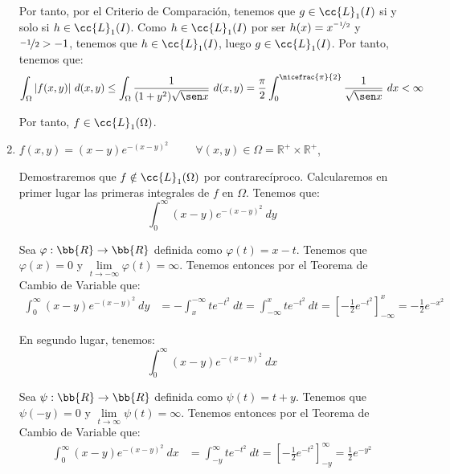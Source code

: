\begin{ejercicio}
\begin{enumerate}
        Por tanto, por el Criterio de Comparación, tenemos que $g\in \cc{L}_1(I)$ si y solo si $h\in \cc{L}_1(I)$. Como $h\in \cc{L}_1(I)$ por ser $h(x)=x^{\nicefrac{-1}{2}}$ y $\nicefrac{-1}{2}>-1$,
        tenemos que $h\in \cc{L}_1(I)$, luego $g\in \cc{L}_1(I)$. Por tanto, tenemos que:
        \begin{equation*}
            \int_{\Omega} |f(x, y)|~d(x, y) \leq
            \int_{\Omega} \dfrac{1}{(1 + y^2) \sqrt{\sen x}}~d(x, y)
            = \frac{\pi}{2}\int_{0}^{\nicefrac{\pi}{2}} \frac{1}{\sqrt{\sen x}}~dx < \infty
        \end{equation*}

        Por tanto, $f\in \cc{L}_1(\Omega)$.

        \item $f(x, y) = (x - y) e^{-(x-y)^2} \hspace{1cm} \forall (x, y) \in \Omega= \mathbb{R}^+ \times \mathbb{R}^+$,
        
        Demostraremos que $f\notin \cc{L}_1(\Omega)$ por contrarecíproco. Calcularemos en primer lugar las primeras integrales de $f$ en $\Omega$.
        Tenemos que:
        \begin{equation*}
            \int_{0}^{\infty} (x-y)e^{-(x-y)^2}~dy
        \end{equation*}

        Sea $\varphi:\bb{R}\to\bb{R}$ definida como $\varphi(t)=x-t$. Tenemos que $\varphi(x)=0$ y $\lim\limits_{t\to-\infty}\varphi(t)=\infty$. Tenemos entonces por el
        Teorema de Cambio de Variable que:
        \begin{align*}
            \int_{0}^{\infty} (x-y)e^{-(x-y)^2}~dy
            &= -\int_{x}^{-\infty}te^{-t^2}~dt
            = \int_{-\infty}^{x} te^{-t^2}~dt
            = \left[ -\frac{1}{2}e^{-t^2} \right]_{-\infty}^{x} = -\frac{1}{2}e^{-x^2}
        \end{align*}

        En segundo lugar, tenemos:
        \begin{equation*}
            \int_{0}^{\infty} (x-y)e^{-(x-y)^2}~dx
        \end{equation*}

        Sea $\psi:\bb{R}\to\bb{R}$ definida como $\psi(t)=t+y$. Tenemos que $\psi(-y)=0$ y $\lim\limits_{t\to\infty}\psi(t)=\infty$. Tenemos entonces por el
        Teorema de Cambio de Variable que:
        \begin{align*}
            \int_{0}^{\infty} (x-y)e^{-(x-y)^2}~dx
            &= \int_{-y}^{\infty}te^{-t^2}~dt
            = \left[ -\frac{1}{2}e^{-t^2} \right]_{-y}^{\infty} = \frac{1}{2}e^{-y^2}
        \end{align*}


\end{enumerate}
\end{ejercicio}
